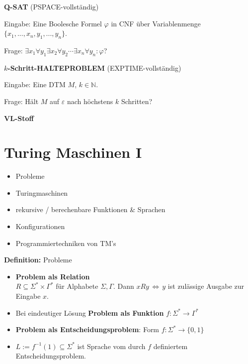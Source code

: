 \documentclass[a4paper,graphics,11pt]{article}
\newcommand{\eps}[0]{\varepsilon}
\newcommand{\Iff}[0]{\,\Longleftrightarrow\,}
\begin{document}
\strut

\textbf{Q-SAT} (\textsf{PSPACE}-vollständig)

Eingabe: Eine Boolesche Formel $\varphi$ in CNF über Variablenmenge $\{x_1,...,x_n,y_1,...,y_n\}$.

Frage: $\exists x_1 \forall y_1 \exists x_2 \forall y_2 \cdots \exists x_n \forall y_n : \varphi$?

\strut

\textbf{$k$-Schritt-HALTEPROBLEM} (\textsf{EXPTIME}-vollständig)

Eingabe: Eine DTM $M$, $k \in \mathbb{N}$.

Frage: Hält $M$ auf $\eps$ nach höchstens $k$ Schritten?

\strut


\newpage

\begin{center}
    \LARGE \textbf{VL-Stoff}
\end{center}

\section{Turing Maschinen I}

\begin{itemize}
    \item Probleme
    \item Turingmaschinen
    \item rekursive / berechenbare Funktionen \& Sprachen
    \item Konfigurationen
    \item Programmiertechniken von TM's
\end{itemize}

\textbf{Definition:} Probleme
\begin{itemize}
    \item \textbf{Problem als Relation}\\
        $R \subseteq \Sigma^* \times \Gamma^*$ für Alphabete $\Sigma, \Gamma$.
        Dann $x R y\Iff y$ ist zulässige Ausgabe zur Eingabe $x$.
    \item Bei eindeutiger Lösung \textbf{Problem als Funktion} $f: \Sigma^* \to \Gamma^*$
    \item \textbf{Problem als Entscheidungsproblem}: Form $f : \Sigma^* \to \{0,1\}$
    \item $L := f^{-1}(1) \subseteq \Sigma^*$ ist Sprache vom durch $f$ definiertem Entscheidungsproblem.
\end{itemize}
\end{document}

